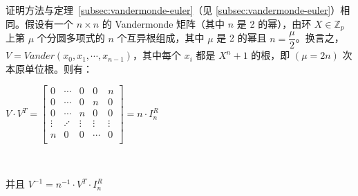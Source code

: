 \begin{tcolorbox}[title={\textbf{\tboxtheorem{\ref*{subsec:vandermonde-euler-integer-ring}} 以环（$\mathbb{Z}_p$）上指标为 2 的幂的分圆多项式的根构造 Vandermonde 矩阵}}]

证明方法与定理~\ref*{subsec:vandermonde-euler}（见 \autoref{subsec:vandermonde-euler}）相同。假设有一个 $n \times n$ 的 Vandermonde 矩阵（其中 $n$ 是 2 的幂），由环 $X \in \mathbb{Z}_p$ 上第 $\mu$ 个分圆多项式的 $n$ 个互异根组成，其中 $\mu$ 是 2 的幂且 $n = \dfrac{\mu}{2}$。换言之，$V = \mathit{Vander}(x_0, x_1, \cdots, x_{n-1})$，其中每个 $x_i$ 都是 $X^n + 1$ 的根，即 $(\mu=2n)$ 次本原单位根。则有：

$V \cdot V^T = \begin{bmatrix}
0 & \cdots & 0 & 0 & n\\
0 & \cdots & 0 & n & 0\\
0 & \cdots & n & 0 & 0\\
\vdots & \iddots & \vdots & \vdots & \vdots \\
n & 0 & 0 & \cdots & 0\\
\end{bmatrix} = n \cdot I^R_n$

$ $

并且 $V^{-1} = n^{-1}\cdot V^T \cdot I_n^R$


\end{tcolorbox}
